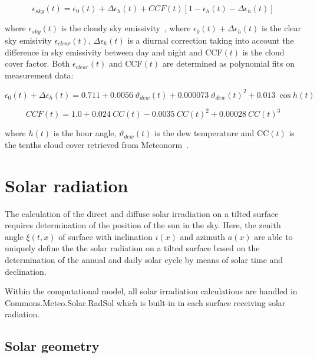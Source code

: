 \documentclass{book}
\begin{document}
\begin{equation}
\epsilon_{sky}(t) = \epsilon_{0}(t)+\Delta\epsilon_{h}(t)+CCF(t)\left[1-\epsilon_{h}(t)-\Delta\epsilon_{h}(t)\right]
\end{equation}

where $\epsilon_{sky}(t)$ is the cloudy sky emissivity~\cite{Berdahl1982,Berdahl1984,Martin1984}, where $\epsilon_{0}(t)+\Delta\epsilon_{h}(t)$ is the clear sky emisivity $\epsilon_{clear}(t)$, $\Delta\epsilon_{h}(t)$ is a diurnal correction taking into account the difference in sky emissivity between day and night and CCF$(t)$ is the cloud cover factor. Both  $\epsilon_{clear}(t)$ and CCF$(t)$ are determined as polynomial fits on measurement data:

\begin{equation}
\epsilon_{0}(t)+\Delta\epsilon_{h}(t) = 0.711 + 0.0056\ \vartheta_{dew}(t) + 0.000073\ \vartheta_{dew}(t)^{2} + 0.013\ \cos h(t)
\end{equation}

\begin{equation}
CCF(t) = 1.0 + 0.024\ CC(t) - 0.0035\ CC(t)^{2} + 0.00028\ CC(t)^{3}
\end{equation}

where $h(t)$ is the hour angle, $\vartheta_{dew}(t)$ is the dew temperature and CC$(t)$ is the tenths cloud cover retrieved from Meteonorm~\cite{Kasten1979,Perraudeau1990}. 

\section{Solar radiation}
\label{chap:climsol}

The calculation of the direct and diffuse solar irradiation on a tilted surface requires determination of the position of the sun in the sky. Here, the zenith angle $\xi(t,x)$ of surface with inclination $i(x)$ and azimuth $a(x)$ are able to uniquely define the the solar radiation on a tilted surface based on the determination of the annual and daily solar cycle by means of solar time and declination.

Within the computational model, all solar irradiation calculations are handled in Commons.Meteo.Solar.RadSol which is built-in in each surface receiving solar radiation.

\subsection{Solar geometry}
\end{document}
